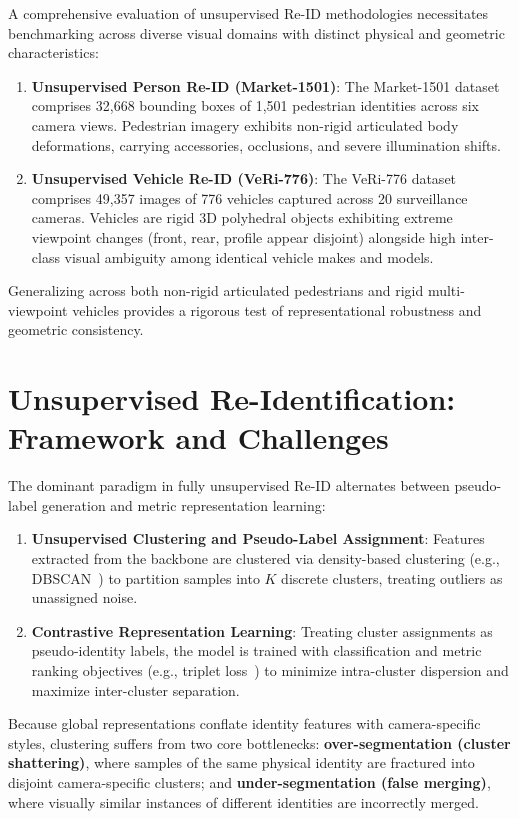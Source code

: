 A comprehensive evaluation of unsupervised Re-ID methodologies necessitates benchmarking across diverse visual domains with distinct physical and geometric characteristics:
\begin{enumerate}[itemsep=0.5pt,parsep=0pt,topsep=1pt,leftmargin=*]
    \item \textbf{Unsupervised Person Re-ID (Market-1501)}: The Market-1501 dataset~\cite{zheng2015scalable} comprises 32,668 bounding boxes of 1,501 pedestrian identities across six camera views. Pedestrian imagery exhibits non-rigid articulated body deformations, carrying accessories, occlusions, and severe illumination shifts.
    \item \textbf{Unsupervised Vehicle Re-ID (VeRi-776)}: The VeRi-776 dataset~\cite{liu2016deepveri} comprises 49,357 images of 776 vehicles captured across 20 surveillance cameras. Vehicles are rigid 3D polyhedral objects exhibiting extreme viewpoint changes (front, rear, profile appear disjoint) alongside high inter-class visual ambiguity among identical vehicle makes and models.
\end{enumerate}
Generalizing across both non-rigid articulated pedestrians and rigid multi-viewpoint vehicles provides a rigorous test of representational robustness and geometric consistency.

\section{Unsupervised Re-Identification: Framework and Challenges}
\label{sec:unsupervised_reid_challenge}

The dominant paradigm in fully unsupervised Re-ID alternates between pseudo-label generation and metric representation learning:
\begin{enumerate}[itemsep=0.5pt,parsep=0pt,topsep=1pt,leftmargin=*]
    \item \textbf{Unsupervised Clustering and Pseudo-Label Assignment}: Features extracted from the backbone are clustered via density-based clustering (e.g., DBSCAN~\cite{ester1996dbscan}) to partition samples into $K$ discrete clusters, treating outliers as unassigned noise.
    \item \textbf{Contrastive Representation Learning}: Treating cluster assignments as pseudo-identity labels, the model is trained with classification and metric ranking objectives (e.g., triplet loss~\cite{hermans2017triplet}) to minimize intra-cluster dispersion and maximize inter-cluster separation.
\end{enumerate}
Because global representations conflate identity features with camera-specific styles, clustering suffers from two core bottlenecks: \textbf{over-segmentation (cluster shattering)}, where samples of the same physical identity are fractured into disjoint camera-specific clusters; and \textbf{under-segmentation (false merging)}, where visually similar instances of different identities are incorrectly merged.

